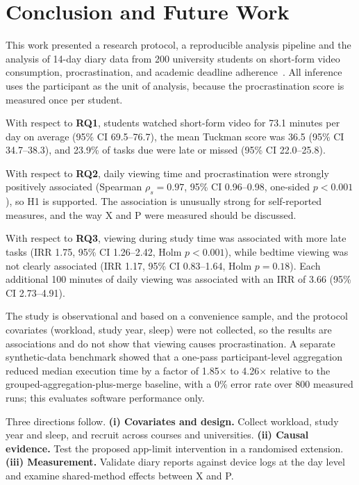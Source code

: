 \section{Conclusion and Future Work}
\label{sec:conclusion}

This work presented a research protocol, a reproducible analysis pipeline and the analysis of 14-day diary data from 200 university students on short-form video consumption, procrastination, and academic deadline adherence~\cite{akniet2026shortform}. All inference uses the participant as the unit of analysis, because the procrastination score is measured once per student.

With respect to \textbf{RQ1}, students watched short-form video for 73.1 minutes per day on average (95\% CI 69.5--76.7), the mean Tuckman score was 36.5 (95\% CI 34.7--38.3), and 23.9\% of tasks due were late or missed (95\% CI 22.0--25.8).

With respect to \textbf{RQ2}, daily viewing time and procrastination were strongly positively associated (Spearman $\rho_s = 0.97$, 95\% CI 0.96--0.98, one-sided $p < 0.001$), so H1 is supported. The association is unusually strong for self-reported measures, and the way X and P were measured should be discussed.

With respect to \textbf{RQ3}, viewing during study time was associated with more late tasks (IRR 1.75, 95\% CI 1.26--2.42, Holm $p < 0.001$), while bedtime viewing was not clearly associated (IRR 1.17, 95\% CI 0.83--1.64, Holm $p = 0.18$). Each additional 100 minutes of daily viewing was associated with an IRR of 3.66 (95\% CI 2.73--4.91).

The study is observational and based on a convenience sample, and the protocol covariates (workload, study year, sleep) were not collected, so the results are associations and do not show that viewing causes procrastination. A separate synthetic-data benchmark showed that a one-pass participant-level aggregation reduced median execution time by a factor of 1.85$\times$ to 4.26$\times$ relative to the grouped-aggregation-plus-merge baseline, with a 0\% error rate over 800 measured runs; this evaluates software performance only.

Three directions follow. \textbf{(i) Covariates and design.} Collect workload, study year and sleep, and recruit across courses and universities. \textbf{(ii) Causal evidence.} Test the proposed app-limit intervention in a randomised extension. \textbf{(iii) Measurement.} Validate diary reports against device logs at the day level and examine shared-method effects between X and P.
